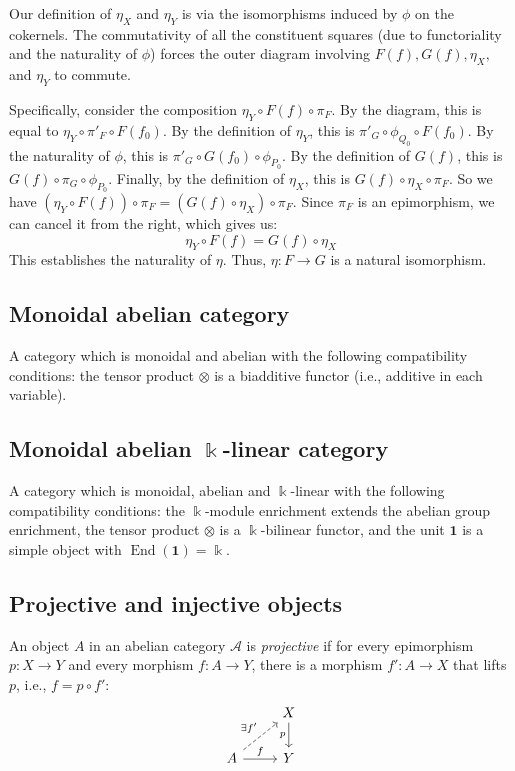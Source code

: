 \documentclass[11pt]{article}
\theoremstyle{definition}
\begin{document}
Our definition of $\eta_X$ and $\eta_Y$ is via the isomorphisms induced by $\phi$ on the cokernels. The commutativity of all the constituent squares (due to functoriality and the naturality of $\phi$) forces the outer diagram involving $F(f), G(f), \eta_X,$ and $\eta_Y$ to commute.

Specifically, consider the composition $\eta_Y \circ F(f) \circ \pi_F$. By the diagram, this is equal to $\eta_Y \circ \pi'_F \circ F(f_0)$. By the definition of $\eta_Y$, this is $\pi'_G \circ \phi_{Q_0} \circ F(f_0)$. By the naturality of $\phi$, this is $\pi'_G \circ G(f_0) \circ \phi_{P_0}$. By the definition of $G(f)$, this is $G(f) \circ \pi_G \circ \phi_{P_0}$. Finally, by the definition of $\eta_X$, this is $G(f) \circ \eta_X \circ \pi_F$.
So we have $(\eta_Y \circ F(f)) \circ \pi_F = (G(f) \circ \eta_X) \circ \pi_F$. Since $\pi_F$ is an epimorphism, we can cancel it from the right, which gives us:
\[
\eta_Y \circ F(f) = G(f) \circ \eta_X
\]
This establishes the naturality of $\eta$. Thus, $\eta: F \to G$ is a natural isomorphism.




      
\subsection{Monoidal abelian category}
A category which is monoidal and abelian with the following compatibility conditions: the tensor product \(\otimes\) is a biadditive functor (i.e., additive in each variable).

\subsection{Monoidal abelian \(\Bbbk\)-linear category}
A category which is monoidal, abelian and \(\Bbbk\)-linear with the following compatibility conditions: the \(\Bbbk\)-module enrichment extends the abelian group enrichment, the tensor product \(\otimes\) is a \(\Bbbk\)-bilinear functor, and the unit \(\mathbf{1}\) is a simple object with \(\operatorname{End}(\mathbf{1}) = \Bbbk\).

\subsection{Projective and injective objects}
An object \(A\) in an abelian category \(\mathcal{A}\) is \emph{projective} if for every epimorphism \(p: X \to Y\) and every morphism \(f: A \to Y\), there is a morphism \(f': A \to X\) that lifts \(p\), i.e., \(f = p \circ f'\):
\[
\begin{tikzcd}
& X \arrow[d, "p"'] \\
A \arrow[r, "f"] \arrow[ur, dashed, "\exists f'"] & Y
\end{tikzcd}
\]
\end{document}
